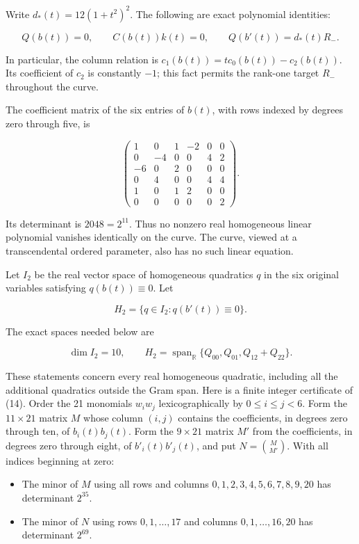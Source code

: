 \documentclass[11pt]{article}
\begin{document}
Write \(d_*(t)=12(1+t^2)^2\). The following are exact polynomial identities:

\[
Q(b(t))=0,\qquad C(b(t))k(t)=0,\qquad
Q(b'(t))=d_*(t)R_-.
\tag{12}
\]

In particular, the column relation is
\(c_1(b(t))=t c_0(b(t))-c_2(b(t))\). Its coefficient of \(c_2\) is
constantly \(-1\); this fact permits the rank-one target \(R_-\) throughout
the curve.

The coefficient matrix of the six entries of \(b(t)\), with rows indexed by
degrees zero through five, is

\[
\begin{pmatrix}
1&0&1&-2&0&0\\
0&-4&0&0&4&2\\
-6&0&2&0&0&0\\
0&4&0&0&4&4\\
1&0&1&2&0&0\\
0&0&0&0&0&2
\end{pmatrix}.
\tag{13}
\]

Its determinant is \(2048=2^{11}\). Thus no nonzero real homogeneous
linear polynomial vanishes identically on the curve. The curve, viewed at a
transcendental ordered parameter, also has no such linear equation.

Let \(I_2\) be the real vector space of homogeneous quadratics \(q\) in the
six original variables satisfying \(q(b(t))\equiv0\). Let

\[
H_2=\{q\in I_2:q(b'(t))\equiv0\}.
\]

The exact spaces needed below are

\[
\dim I_2=10,\qquad
H_2=\operatorname{span}_{\mathbb R}\{Q_{00},Q_{01},Q_{12}+Q_{22}\}.
\tag{14}
\]

These statements concern every real homogeneous quadratic, including all
the additional quadratics outside the Gram span. Here is a finite integer
certificate of (14). Order the 21 monomials \(w_iw_j\) lexicographically by
\(0\le i\le j<6\). Form the \(11\times21\) matrix \(M\) whose column
\((i,j)\) contains the coefficients, in degrees zero through ten, of
\(b_i(t)b_j(t)\). Form the \(9\times21\) matrix \(M'\) from the coefficients,
in degrees zero through eight, of \(b'_i(t)b'_j(t)\), and put
\(N=\binom{M}{M'}\). With all indices beginning at zero:

\begin{itemize}
\item The minor of \(M\) using all rows and columns
  \(0,1,2,3,4,5,6,7,8,9,20\) has determinant \(2^{35}\).
\item The minor of \(N\) using rows \(0,1,\ldots,17\) and columns
  \(0,1,\ldots,16,20\) has determinant \(2^{69}\).
\end{itemize}
\end{document}
